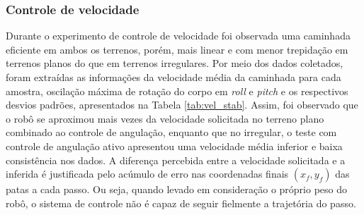 \documentclass[../main.tex]{subfiles}
\begin{document}
  \subsubsection{Controle de velocidade}
  Durante o experimento de controle de velocidade foi observada uma caminhada eficiente em ambos os terrenos, porém, mais linear e com menor trepidação em terrenos planos do que em terrenos irregulares. Por meio dos dados coletados, foram extraídas as informações da velocidade média da caminhada para cada amostra, oscilação máxima de rotação do corpo em \textit{roll} e \textit{pitch} e os respectivos desvios padrões, apresentados na Tabela \ref{tab:vel_stab}. Assim, foi observado que o robô se aproximou mais vezes da velocidade solicitada no terreno plano combinado ao controle de angulação, enquanto que no irregular, o teste com controle de angulação ativo apresentou uma velocidade média inferior e baixa consistência nos dados. A diferença percebida entre a velocidade solicitada e a inferida é justificada pelo acúmulo de erro nas coordenadas finais $(x_f, y_f)$ das patas a cada passo. Ou seja, quando levado em consideração o próprio peso do robô, o sistema de controle não é capaz de seguir fielmente a trajetória do passo.
\end{document}
